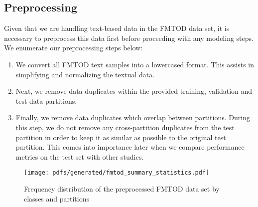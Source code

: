 \subsection{Preprocessing}

Given that we are handling text-based data in the FMTOD data set, it is
necessary to preprocess this data first before proceeding with any modeling
steps. We enumerate our preprocessing steps below:

\begin{enumerate}{}
  \item We convert all FMTOD text samples into a lowercased format. This assists
  in simplifying and normalizing the textual data.
  \item Next, we remove data duplicates within the provided training, validation and test
  data partitions.
  \item Finally, we remove data duplicates which overlap between partitions.
  During this step, we do not remove any cross-partition duplicates from the
  test partition in order to keep it as similar as possible to the original test
  partition. This comes into importance later when we compare performance metrics
  on the test set with other studies.
\end{enumerate}

\begin{figure}[t!]
  \centering
  \texttt{[image: pdfs/generated/fmtod\_summary\_statistics.pdf]}
  \caption{Frequency distribution of the preprocessed FMTOD data set by
    classes and partitions}
  \label{fig:fmtod}
\end{figure}

